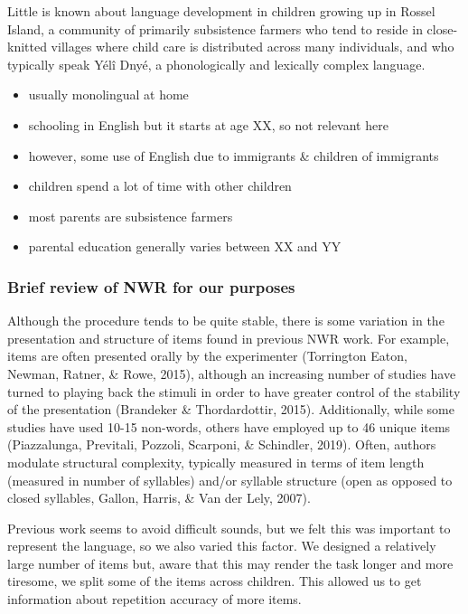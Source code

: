 \documentclass[english,,man,floatsintext]{apa6}
\providecommand{\tightlist}{%
  \setlength{\itemsep}{0pt}\setlength{\parskip}{0pt}}
\begin{document}
Little is known about language development in children growing up in Rossel Island, a community of primarily subsistence farmers who tend to reside in close-knitted villages where child care is distributed across many individuals, and who typically speak Yélî Dnyé, a phonologically and lexically complex language.

\begin{itemize}
\tightlist
\item
  usually monolingual at home
\item
  schooling in English but it starts at age XX, so not relevant here
\item
  however, some use of English due to immigrants \& children of immigrants
\item
  children spend a lot of time with other children
\item
  most parents are subsistence farmers
\item
  parental education generally varies between XX and YY
\end{itemize}

\hypertarget{brief-review-of-nwr-for-our-purposes}{%
\subsubsection{Brief review of NWR for our purposes}\label{brief-review-of-nwr-for-our-purposes}}

Although the procedure tends to be quite stable, there is some variation in the presentation and structure of items found in previous NWR work. For example, items are often presented orally by the experimenter (Torrington Eaton, Newman, Ratner, \& Rowe, 2015), although an increasing number of studies have turned to playing back the stimuli in order to have greater control of the stability of the presentation (Brandeker \& Thordardottir, 2015). Additionally, while some studies have used 10-15 non-words, others have employed up to 46 unique items (Piazzalunga, Previtali, Pozzoli, Scarponi, \& Schindler, 2019). Often, authors modulate structural complexity, typically measured in terms of item length (measured in number of syllables) and/or syllable structure (open as opposed to closed syllables, Gallon, Harris, \& Van der Lely, 2007).

Previous work seems to avoid difficult sounds, but we felt this was important to represent the language, so we also varied this factor. We designed a relatively large number of items but, aware that this may render the task longer and more tiresome, we split some of the items across children. This allowed us to get information about repetition accuracy of more items.
\end{document}
